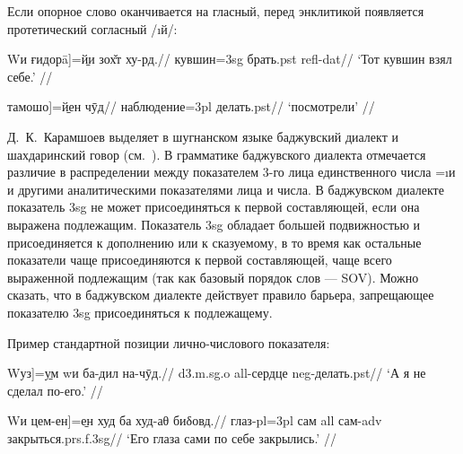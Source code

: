 Если опорное слово оканчивается на гласный, перед энклитикой появляется протетический согласный /\i{й}/:

\begingl
\gla {[}Wи ғидорā{]}=\b{йи} зох̌т ху-рд.//
 кувшин={\sc 3sg} брать.{\sc pst} {\sc refl-dat}//
\glft ‘Тот кувшин взял себе.’ //
\endgl \xe

\begingl
\gla {[}тамошо{]}=\b{йен} чӯд//
\glc наблюдение={\sc 3pl} делать.{\sc pst}//
\glft ‘посмотрели’ //
\endgl \xe

Д.~К.~Карамшоев выделяет в шугнанском языке баджувский диалект и шахдаринский говор (см.~\parencite[5]{karamshoev1988}). В грамматике баджувского диалекта \parencite[152]{karamshoev1963} отмечается различие в распределении между показателем 3-го лица единственного числа =\i{и} и другими аналитическими показателями лица и числа. В баджувском диалекте показатель {\sc 3sg} не может присоединяться к первой составляющей, если она выражена подлежащим. Показатель {\sc 3sg} обладает большей подвижностью и присоединяется к дополнению или к сказуемому, в то время как остальные показатели чаще присоединяются к первой составляющей, чаще всего выраженной подлежащим (так как базовый порядок слов — SOV). Можно сказать, что в баджувском диалекте действует правило барьера, запрещающее показателю {\sc 3sg} присоединяться к подлежащему.

Пример стандартной позиции лично-числового показателя:

\begingl
\gla {[}Wуз{]}=\b{ум} wи ба-дил на-чӯд.//
 {\sc d3.m.sg.o} {\sc all}-сердце {\sc neg}-делать.{\sc pst}//
\glft ‘А я не сделал по-его.’ //
\endgl \xe

\begingl
\gla {[}Wи цем-ен{]}=\b{ен} худ ба худ-аθ биδовд.//
 глаз-{\sc pl=3pl} сам {\sc all} сам-{\sc adv} закрыться.{\sc prs.f.3sg}//
\glft ‘Его глаза сами по себе закрылись.’ //
\endgl \xe

